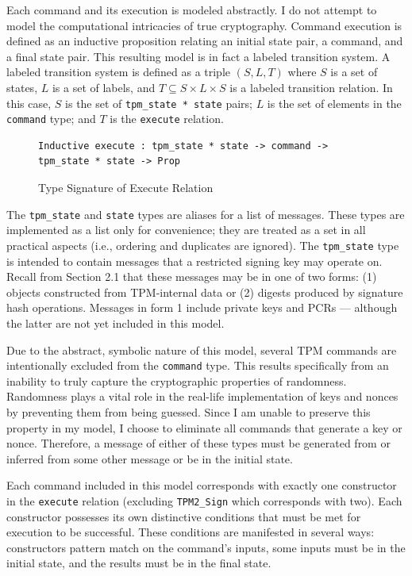 \documentclass[runningheads]{llncs}
\begin{document}
Each command and its execution is modeled abstractly. I do not attempt to model the computational intricacies of true cryptography. Command execution is defined as an inductive proposition relating an initial state pair, a command, and a final state pair. This resulting model is in fact a labeled transition system. A labeled transition system is defined as a triple $(S,L,T)$ where $S$ is a set of states, $L$ is a set of labels, and $T \subseteq S \times L \times S$ is a labeled transition relation. In this case, $S$ is the set of \verb|tpm_state * state| pairs; $L$ is the set of elements in the \verb|command| type; and $T$ is the \verb|execute| relation. 
\begin{figure}[h]
\begin{lstlisting}[language=Coq]
Inductive execute : tpm_state * state -> command -> tpm_state * state -> Prop
\end{lstlisting}
\caption{Type Signature of Execute Relation}
\end{figure}
The \verb|tpm_state| and \verb|state| types are aliases for a list of messages. These types are implemented as a list only for convenience; they are treated as a set in all practical aspects (i.e., ordering and duplicates are ignored). The \verb|tpm_state| type is intended to contain messages that a restricted signing key may operate on. Recall from Section 2.1 that these messages may be in one of two forms: (1) objects constructed from TPM-internal data or (2) digests produced by signature hash operations. Messages in form 1 include private keys and PCRs --- although the latter are not yet included in this model. 

Due to the abstract, symbolic nature of this model, several TPM commands are intentionally excluded from the \verb|command| type. This results specifically from an inability to truly capture the cryptographic properties of randomness. Randomness plays a vital role in the real-life implementation of keys and nonces by preventing them from being guessed. Since I am unable to preserve this property in my model, I choose to eliminate all commands that generate a key or nonce. Therefore, a message of either of these types must be generated from or inferred from some other message or be in the initial state. 

Each command included in this model corresponds with exactly one constructor in the \verb|execute| relation (excluding \verb|TPM2_Sign| which corresponds with two). Each constructor possesses its own distinctive conditions that must be met for execution to be successful. These conditions are manifested in several ways: constructors pattern match on the command's inputs, some inputs must be in the initial state, and the results must be in the final state.
\end{document}
